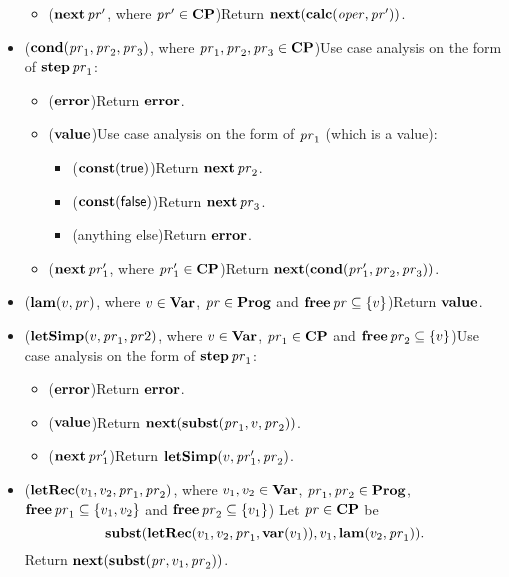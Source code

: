 \begin{itemize}
\begin{itemize}
  \item ($\mathbf{next}\,\mathit{pr}'$, where $\mathit{pr}'\in\mathbf{CP}$)\quad Return
    $\mathbf{next}(\mathbf{calc}(\mathit{oper},\mathit{pr}'))$.
  \end{itemize}

\item ($\mathbf{cond}(\mathit{pr}_1,\mathit{pr}_2,\mathit{pr}_3)$, where
  $\mathit{pr}_1,\mathit{pr}_2,\mathit{pr}_3\in\mathbf{CP}$)\quad Use case analysis on the form
  of $\mathbf{step}\,\mathit{pr}_1$:
  \begin{itemize}
  \item ($\mathbf{error}$)\quad Return $\mathbf{error}$.

  \item ($\mathbf{value}$)\quad Use case analysis on the form of $\mathit{pr}_1$ (which
    is a value):
    \begin{itemize}
    \item ($\mathbf{const}(\mathsf{true})$)\quad Return $\mathbf{next}\,\mathit{pr}_2$.

    \item ($\mathbf{const}(\mathsf{false})$)\quad Return $\mathbf{next}\,\mathit{pr}_3$.

    \item (anything else)\quad Return $\mathbf{error}$.
    \end{itemize}

  \item ($\mathbf{next}\,\mathit{pr}'_1$, where $\mathit{pr}'_1\in\mathbf{CP}$)\quad Return
    $\mathbf{next}(\mathbf{cond}(\mathit{pr}'_1, \mathit{pr}_2, \mathit{pr}_3))$.
  \end{itemize}

\item ($\mathbf{lam}(v,\mathit{pr})$, where $v\in\mathbf{Var}$,
  $\mathit{pr}\in\mathbf{Prog}$ and $\mathbf{free}\,\mathit{pr}\subseteq\{v\}$)\quad Return $\mathbf{value}$.

\item ($\mathbf{letSimp}(v, \mathit{pr}_1, \mathit{pr}2)$, where $v\in\mathbf{Var}$,
  $\mathit{pr}_1\in\mathbf{CP}$ and $\mathbf{free}\,\mathit{pr}_2\subseteq\{v\}$)\quad Use case analysis
  on the form of $\mathbf{step}\,\mathit{pr}_1$:
  \begin{itemize}
  \item ($\mathbf{error}$)\quad Return $\mathbf{error}$.

  \item ($\mathbf{value}$)\quad Return $\mathbf{next}(\mathbf{subst}(\mathit{pr}_1,v,\mathit{pr}_2))$.

  \item ($\mathbf{next}\,\mathit{pr}'_1$)\quad Return $\mathbf{letSimp}(v,\mathit{pr}'_1,\mathit{pr}_2)$.
  \end{itemize}

\item ($\mathbf{letRec}(v_1,v_2,\mathit{pr}_1,\mathit{pr}_2)$, where $v_1,v_2\in\mathbf{Var}$,
  $\mathit{pr}_1,\mathit{pr}_2\in\mathbf{Prog}$, $\mathbf{free}\,\mathit{pr}_1\subseteq\{v_1,v_2\}$ and
  $\mathbf{free}\,\mathit{pr}_2\subseteq\{v_1\}$)\quad
  Let $\mathit{pr}\in\mathbf{CP}$ be
  \begin{displaymath}
    \mathbf{subst}
    (\mathbf{letRec}(v_1, v_2, \mathit{pr}_1, \mathbf{var}(v_1)),
     v_1,
     \mathbf{lam}(v_2, \mathit{pr}_1)) .
  \end{displaymath}
  Return $\mathbf{next}(\mathbf{subst}(\mathit{pr},v_1,\mathit{pr}_2))$.
\end{itemize}


